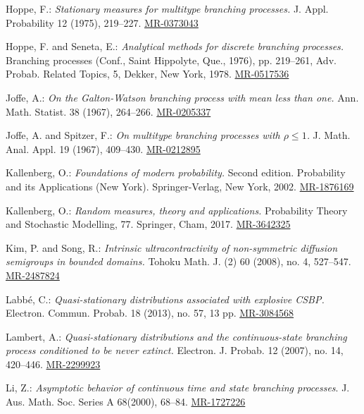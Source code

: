 \documentclass[12pt,a4paper]{amsart}
\numberwithin{equation}{section}
\theoremstyle{plain}
\theoremstyle{definition}
\theoremstyle{remark}
\def\MR#1{\href{http://www.ams.org/mathscinet-getitem?mr=#1}{MR-#1}}
\begin{document}
\begin{thebibliography}{99}
	
	Hoppe, F.:
	\emph{Stationary measures for multitype branching processes.}
	J. Appl. Probability 12 (1975), 219--227.
	\MR{0373043}
	
	Hoppe, F. and Seneta, E.:
	\emph{Analytical methods for discrete branching processes.}
	Branching processes (Conf., Saint Hippolyte, Que., 1976), pp. 219--261,
	Adv. Probab. Related Topics, 5, Dekker, New York, 1978.
	\MR{0517536}
	
	Joffe, A.:
	\emph{On the Galton-Watson branching process with mean less than one.}
	Ann. Math. Statist. 38 (1967), 264--266.
	\MR{0205337}
	
	Joffe, A. and Spitzer, F.:
	\emph{On multitype branching processes with $\rho \leq 1$.}
	J. Math. Anal. Appl. 19 (1967), 409--430.
	\MR{0212895}
	
	Kallenberg, O.:
	\emph{Foundations of modern probability.}
	Second edition. Probability and its Applications (New York). Springer-Verlag, New York, 2002.
	\MR{1876169}
	
	Kallenberg, O.:
	\emph{Random measures, theory and applications.}
	Probability Theory and Stochastic Modelling, 77. Springer, Cham, 2017.
	\MR{3642325}
	
	Kim, P. and Song, R.:
	\emph{Intrinsic ultracontractivity of non-symmetric diffusion semigroups in bounded domains.}
	Tohoku Math. J. (2) 60 (2008), no. 4, 527--547.
	\MR{2487824}
	
	Labb\'e, C.:
	\emph{Quasi-stationary distributions associated with explosive CSBP.}
	Electron. Commun. Probab. 18 (2013), no. 57, 13 pp.
	\MR{3084568}
	
	Lambert, A.:
	\emph{Quasi-stationary distributions and the continuous-state branching process conditioned to be never extinct.}
	Electron. J. Probab. 12 (2007), no. 14, 420--446.
	\MR{2299923}

	 Li, Z.:
	\emph{Asymptotic behavior of continuous time and state branching processes}.
	J. Aus. Math. Soc. Series A 68(2000), 68--84.
	\MR{1727226}


\end{thebibliography}
\end{document}
